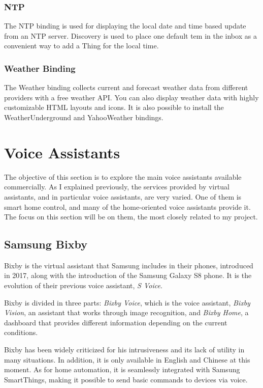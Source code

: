 \subsubsection{NTP}
The NTP binding is used for displaying the local date and time based update from an NTP server. Discovery is used to place one default 
tem in the inbox as a convenient way to add a Thing for the local time.

\subsubsection{Weather Binding}
The Weather binding collects current and forecast weather data from different providers with a free weather API. You can also display
weather data with highly customizable HTML layouts and icons. It is also possible to install the WeatherUnderground and YahooWeather
bindings.

\bigskip
\section{Voice Assistants}
The objective of this section is to explore the main voice assistants available commercially. As I explained previously, the services
provided by virtual assistants, and in particular voice assistants, are very varied. One of them is smart home control, and many of
the home-oriented voice assistants provide it. The focus on this section will be on them, the most closely related to my project.

\subsection{Samsung Bixby}
Bixby is the virtual assistant that Samsung includes in their phones, introduced in 2017, along with the introduction of the Samsung
Galaxy S8 phone. It is the evolution of their previous voice assistant, \textit{S Voice}.

Bixby is divided in three parts: \textit{Bixby Voice}, which is the voice assistant, \textit{Bixby Vision}, an assistant that works through
image recognition, and \textit{Bixby Home}, a dashboard that provides different information depending on the current
conditions.\cite{samsungBixby}

Bixby has been widely criticized for his intrusiveness and its lack of utility in many situations. In addition, it is only available in English
and Chinese at this moment. As for home automation, it is seamlessly integrated with Samsung SmartThings, making it possible to send
basic commands to devices via voice.

